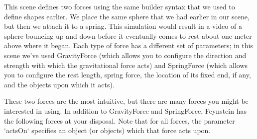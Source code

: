This scene defines two forces using the same builder syntax that we
used to define shapes earlier. We place the same sphere that we had
earlier in our scene, but then we attach it to a spring. This
simulation would result in a video of a sphere bouncing up and down
before it eventually comes to rest about one meter above where it
began. Each type of force has a different set of parameters; in this
scene we've used GravityForce (which allows you to configure the
direction and strength with which the gravitational force acts) and
SpringForce (which allows you to configure the rest length, spring
force, the location of its fixed end, if any, and the objects upon
which it acts).

These two forces are the most intuitive, but there are many forces you
might be interested in using. In addition to GravityForce and
SpringForce, Feynstein has the following forces at your disposal. Note
that for all forces, the parameter `actsOn` specifies an object (or
objects) which that force acts upon.

